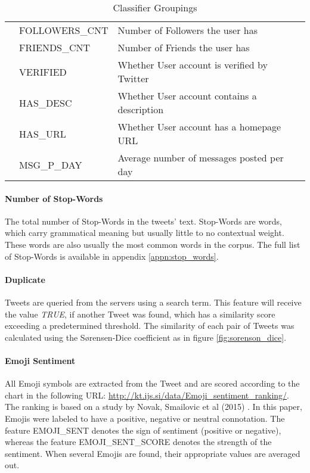 \begin{table}[H]
\begin{center}
{\begin{tabular}{c |l| l}
							& FOLLOWERS\_CNT 			& Number of Followers the user has	\\
							& FRIENDS\_CNT				& Number of Friends the user has	\\
							& VERIFIED					& Whether User account is verified by Twitter\\
							& HAS\_DESC 				& Whether User account contains a description\\
							& HAS\_URL					& Whether User account has a homepage URL	\\
							& MSG\_P\_DAY 				& Average number of messages posted per day	\\
					\hline\hline
				\end{tabular}
				}	
				\end{center}
				\caption[Classifier Groupings]{Classifier Groupings}
				\label{table:desc_features}
			\end{table}
		
		
			\paragraph{Number of Stop-Words}
				The total number of Stop-Words in the tweets' text. Stop-Words are words, which carry grammatical meaning but usually little to no contextual weight. These words are also usually the most common words in the corpus. The full list of Stop-Words is available in appendix \ref{appn:stop_words}.
				
			\paragraph{Duplicate}	
				Tweets are queried from the servers using a search term. This feature will receive the value \textit{TRUE}, if another Tweet was found, which has a similarity score exceeding a predetermined threshold. The similarity of each pair of Tweets was calculated using the S\o rensen-Dice coefficient as in figure \ref{fig:sorenson_dice}.
			
			\paragraph{Emoji Sentiment}
				All Emoji symbols are extracted from the Tweet and are scored according to the chart in the following URL: \url{http://kt.ijs.si/data/Emoji_sentiment_ranking/}. The ranking is based on a study by Novak, Smailovic et al (2015) \cite{Kralj2015emojis}. In this paper, Emojis were labeled to have a positive, negative or neutral connotation. The feature EMOJI\_SENT denotes the sign of sentiment (positive or negative), whereas the feature EMOJI\_SENT\_SCORE denotes the strength of the sentiment. When several Emojis are found, their appropriate values are averaged out. 
				
